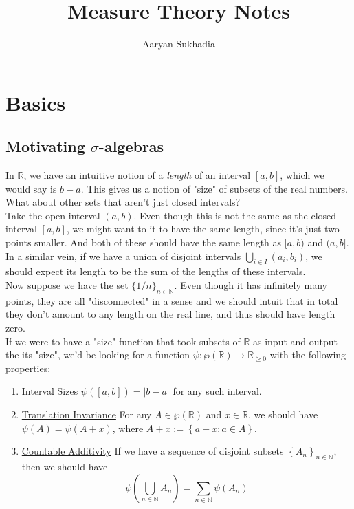 \documentclass[11pt,x11names]{article}
\newcommand{\ul}[1]{\underline{#1}}
\newcommand{\nn}{\mathbb{N}}
\newcommand{\rr}{\mathbb{R}}
\newcommand{\set}[1]{\left\{ #1 \right\}}
\renewcommand{\brack}[1]{\left(   #1 \right)}
\newcommand{\abs}[1]{\left| #1 \right|}
\begin{document}
\title{Measure Theory Notes}

\author{Aaryan Sukhadia}
\date{}

\maketitle
\tableofcontents
\newpage

\section{Basics}


\subsection{Motivating $\sigma$-algebras}

In $\rr$, we have an intuitive notion of a \textit{length} of an interval $[a, b]$, which we would say is $b-a$. This gives us a notion of "size" of subsets of the real numbers. What about other sets that aren't just closed intervals?\\

Take the open interval $(a, b)$. Even though this is not the same as the closed interval $[a, b]$, we might want to it to have the same length, since it's just two points smaller. And both of these should have the same length as $[a, b)$ and $(a, b]$.\\
In a similar vein, if we have a union of disjoint intervals $\bigcup_{i \in I} (a_i, b_i)$, we should expect its length to be the sum of the lengths of these intervals.\\
Now suppose we have the set $\{1/n\}_{n \in \nn}$. Even though it has infinitely many points, they are all "disconnected" in a sense and we should intuit that in total they don't amount to any length on the real line, and thus should have length zero.\\

If we were to have a "size" function that took subsets of $\rr$ as input and output the its "size", we'd be looking for a function $\psi: \wp(\rr) \to \rr_{\geq 0}$ with the following properties:
\begin{enumerate}[(1)]
    \item \ul{Interval Sizes} $\psi([a, b]) = \abs{b-a}$ for any such interval.
    \item \ul{Translation Invariance} For any $A \in \wp(\rr)$ and $x \in \rr$, we should have $\psi(A) = \psi(A + x)$, where $A + x := \set{a + x : a \in A}$.
    \item \ul{Countable Additivity} If we have a sequence of disjoint subsets $\set{A_n}_{n \in \nn}$, then we should have 
    \begin{equation*}
        \psi\brack{\bigcup_{n \in \nn} A_n} = \sum_{n \in \nn} \psi\brack{A_n}
    \end{equation*}
\end{enumerate}
\end{document}
